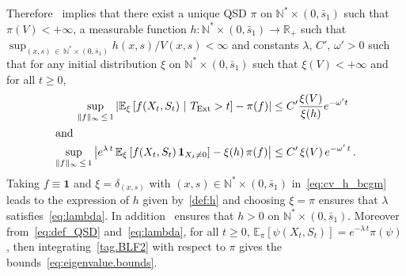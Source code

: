 \documentclass[10pt]{amsart}
\theoremstyle{definition}\newtheorem{defi}[theo]{Definition}\newtheorem{rema}[theo]{Remark}\newtheorem{exam}[theo]{Example}\newtheorem{exem}[theo]{Example}\newtheorem{nota}[theo]{Notation}
\newcommand{\RR}{\mathbb{R}}
\newcommand{\NN}{\mathbb{N}}
\newcommand{\EE}{\mathbb{E}}
\newcommand{\X}{\NN^* \times (0,\bar s_1)}
\newcommand{\Text}{T_{\mathrm{Ext}}}
\newcommand{\1}{\mathbf{1}}
\begin{document}
Therefore~\cite[Theorem~5.1]{BCGM} implies that there exist a unique QSD $\pi$ on $\X$ such that $\pi(V)<+\infty$, a measurable function $h:\X \to \RR_+$ such that $\sup_{(x,s)\,\in\,\X}h(x,s)/V(x,s)<\infty$ and constants $\lambda, \, C',\, \omega'>0$ such that for any initial distribution $\xi$ on $\X$ such that $\xi(V)<+\infty$ and for all $t\geq 0$,
\begin{align}
\sup_{\|f \|_\infty\, \leq\,1} \left|\EE_\xi \left[f(X_t,S_t) \ | \ \Text>t\right] - \pi(f) \right| &\leq C '\frac{\xi(V)}{\xi(h)} e^{-\omega' t}\,\label{eq:cv_qsd_X}
\\
\intertext{and}
\sup_{\|f \|_\infty\,\leq\,1} \left|e^{\lambda \,t}\,\EE_\xi\left[f(X_t,S_t)\,\1_{X_t\neq 0}\right]-\xi(h)\,\pi(f)\right|&\leq C'\,\xi(V)\,e^{-\omega'\,t}\,.\label{eq:cv_h_bcgm}
\end{align}
Taking $f\equiv \1$ and $\xi=\delta_{(x,s)}$ with $(x,s)\in\X$ in~\eqref{eq:cv_h_bcgm} leads to the expression of $h$ given by~\eqref{def:h} and choosing $\xi=\pi$ ensures that $\lambda$ satisfies~\eqref{eq:lambda}. In addition~\cite[Lemma~3.4.]{BCGM} ensures that $h>0$ on $\X$. Moreover from~\eqref{eq:def_QSD} and~\eqref{eq:lambda}, for all $t\geq 0$, $\EE_\pi[\psi(X_t,S_t)]=e^{-\lambda\,t}\pi(\psi)$, then integrating~\eqref{tag.BLF2} with respect to $\pi$ gives the bounds~\eqref{eq:eigenvalue.bounds}.
\end{document}
